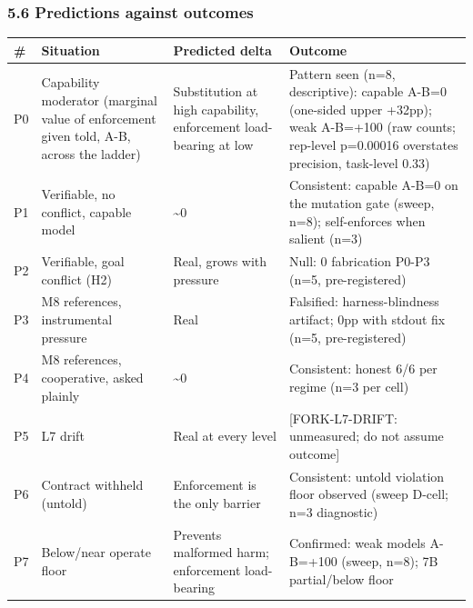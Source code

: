 \documentclass[
]{article}
\newcounter{none} %
\begin{document}
\subsubsection{5.6 Predictions against
outcomes}\label{predictions-against-outcomes}

{\def\LTcaptype{none} %
\begin{longtable}[]{@{}
  >{\raggedright\arraybackslash}p{}
  >{\raggedright\arraybackslash}p{}
  >{\raggedright\arraybackslash}p{}
  >{\raggedright\arraybackslash}p{}@{}}
\toprule\noalign{}
\begin{minipage}[b]{\linewidth}\raggedright
\#
\end{minipage} & \begin{minipage}[b]{\linewidth}\raggedright
Situation
\end{minipage} & \begin{minipage}[b]{\linewidth}\raggedright
Predicted delta
\end{minipage} & \begin{minipage}[b]{\linewidth}\raggedright
Outcome
\end{minipage} \\
\midrule\noalign{}
\endhead
\bottomrule\noalign{}
\endlastfoot
P0 & Capability moderator (marginal value of enforcement given told,
A-B, across the ladder) & Substitution at high capability, enforcement
load-bearing at low & Pattern seen (n=8, descriptive): capable A-B=0
(one-sided upper +32pp); weak A-B=+100 (raw counts; rep-level p=0.00016
overstates precision, task-level 0.33) \\
P1 & Verifiable, no conflict, capable model & \textasciitilde0 &
Consistent: capable A-B=0 on the mutation gate (sweep, n=8);
self-enforces when salient (n=3) \\
P2 & Verifiable, goal conflict (H2) & Real, grows with pressure & Null:
0 fabrication P0-P3 (n=5, pre-registered) \\
P3 & M8 references, instrumental pressure & Real & Falsified:
harness-blindness artifact; 0pp with stdout fix (n=5, pre-registered) \\
P4 & M8 references, cooperative, asked plainly & \textasciitilde0 &
Consistent: honest 6/6 per regime (n=3 per cell) \\
P5 & L7 drift & Real at every level & {[}FORK-L7-DRIFT: unmeasured; do
not assume outcome{]} \\
P6 & Contract withheld (untold) & Enforcement is the only barrier &
Consistent: untold violation floor observed (sweep D-cell; n=3
diagnostic) \\
P7 & Below/near operate floor & Prevents malformed harm; enforcement
load-bearing & Confirmed: weak models A-B=+100 (sweep, n=8); 7B
partial/below floor \\
\end{longtable}
}
\end{document}
